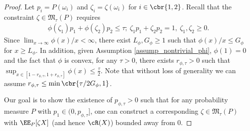 \documentclass[9pt]{article} %
\numberwithin{equation}{section}
\renewcommand{\frac}[2]{\tfrac{#1}{#2}}
\begin{document}
\begin{proof}
Let $p_i = P(\omega_i)$ and $\zeta_i = \zeta(\omega_i)$ for $i \in \cbr{1, 2}$. 
Recall that the constraint $\zeta \in \mathfrak{M}_\tau (P)$ requires 
\begin{align}\label{ambiguity_support_two}
\phi(\zeta_1) p_1 + \phi(\zeta_2) p_2  \leq \tau; ~ \zeta_1 p_1 + \zeta_2 p_2 = 1, ~ \zeta_1, \zeta_2 \geq 0.
\end{align}
Since $\lim_{x \to \infty} \phi(x)/ x < \infty$, 
there exist $L_\phi, G_\phi \geq 1$ such that $\phi(x) / x \leq G_\phi $ for $x \geq L_\phi$. 
In addition, given Assumption \ref{assump_nontrivial_phi}, $\phi(1) = 0$ and the fact that $\phi$ is convex, for any $\tau > 0$, there exists 
$r_{\phi, \tau} > 0$ such that 
$
\sup_{x \in [1-r_{\phi, \tau}, 1+r_{\phi, \tau}] }  \phi(x) \leq \frac{\tau}{2}.
$
Note that without loss of generality we can assume  
$r_{\phi, \tau} \leq  \min\cbr{ {\tau} / {2 G_\phi}, 1}$.

Our goal is to show the existence of $p_{\phi, \tau} > 0$ such that for any probability measure $P$ with $p_1 \in (0,  p_{\phi, \tau}]$, one can construct a corresponding $\zeta \in \mathfrak{M}_\tau(P)$ with  
$\EE_P [\zeta X]$ (and hence $\cR(X)$) bounded away from $0$.


\end{proof}
\end{document}
